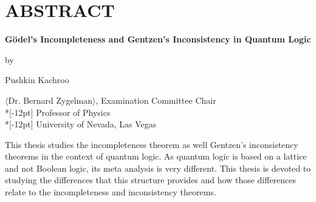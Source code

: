 \chapter*{ABSTRACT}

\begin{center}
\textbf{G\"odel's Incompleteness and Gentzen's Inconsistency in Quantum Logic}

by

Pushkin Kachroo

 $\langle$Dr. Bernard Zygelman$\rangle$, Examination Committee
 Chair\\*[-12pt]%
 Professor of Physics \\*[-12pt]
 University of Nevada, Las Vegas  %
 \end{center}

This thesis studies the incompleteness theorem as well Gentzen's inconsistency theorems in the context of quantum logic.  As quantum logic is based on a lattice and not Boolean logic, its meta analysis is very different.  This thesis is devoted to studying the differences that this structure provides and how those differences relate to the incompleteness and inconsistency theorems.
